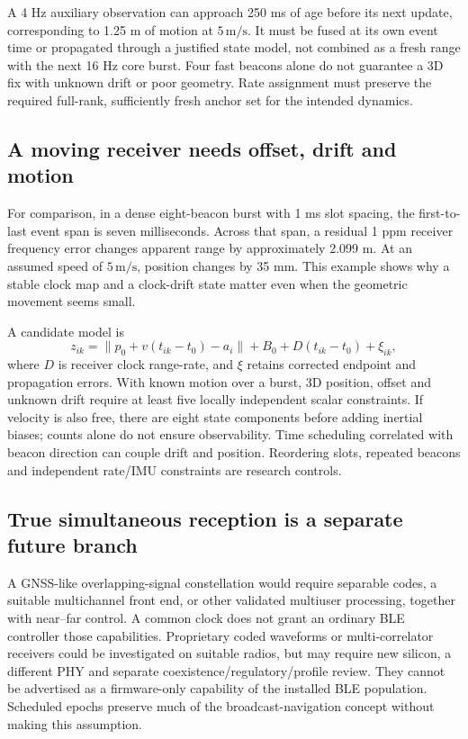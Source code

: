 \documentclass[11pt,letterpaper]{article}
\begin{document}
A 4 Hz auxiliary observation can approach 250 ms of age before its next update, corresponding to 1.25 m of motion at $5\,\mathrm{m/s}$. It must be fused at its own event time or propagated through a justified state model, not combined as a fresh range with the next 16 Hz core burst. Four fast beacons alone do not guarantee a 3D fix with unknown drift or poor geometry. Rate assignment must preserve the required full-rank, sufficiently fresh anchor set for the intended dynamics.

\subsection{A moving receiver needs offset, drift and motion}
For comparison, in a dense eight-beacon burst with 1 ms slot spacing, the first-to-last event span is seven milliseconds. Across that span, a residual 1 ppm receiver frequency error changes apparent range by approximately 2.099 m. At an assumed speed of $5\,\mathrm{m/s}$, position changes by 35 mm. This example shows why a stable clock map and a clock-drift state matter even when the geometric movement seems small.

A candidate model is
\begin{equation}
 z_{ik}=\|p_0+v(t_{ik}-t_0)-a_i\|+B_0+D(t_{ik}-t_0)+\xi_{ik},\label{eq:dynamic}
\end{equation}
where $D$ is receiver clock range-rate, and $\xi$ retains corrected endpoint and propagation errors. With known motion over a burst, 3D position, offset and unknown drift require at least five locally independent scalar constraints. If velocity is also free, there are eight state components before adding inertial biases; counts alone do not ensure observability. Time scheduling correlated with beacon direction can couple drift and position. Reordering slots, repeated beacons and independent rate/IMU constraints are research controls.

\subsection{True simultaneous reception is a separate future branch}
A GNSS-like overlapping-signal constellation would require separable codes, a suitable multichannel front end, or other validated multiuser processing, together with near--far control. A common clock does not grant an ordinary BLE controller those capabilities. Proprietary coded waveforms or multi-correlator receivers could be investigated on suitable radios, but may require new silicon, a different PHY and separate coexistence/regulatory/profile review. They cannot be advertised as a firmware-only capability of the installed BLE population. Scheduled epochs preserve much of the broadcast-navigation concept without making this assumption.
\end{document}
